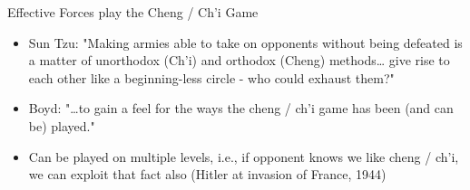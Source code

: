 \vspace{1\baselineskip}

Effective Forces play the Cheng / Ch'i Game
\begin{itemize}
    \item Sun Tzu: "Making armies able to take on opponents without being
        defeated is a matter of unorthodox (Ch'i) and orthodox (Cheng) methods\dots
        give rise to each other like a beginning-less circle - who could exhaust
        them?"
    \item Boyd: "\dots to gain a feel for the ways the cheng / ch'i game has
        been (and can be) played."
    \item Can be played on multiple levels, i.e., if opponent knows we like
        cheng / ch'i, we can exploit that fact also (Hitler at invasion of
        France, 1944)
\end{itemize}

